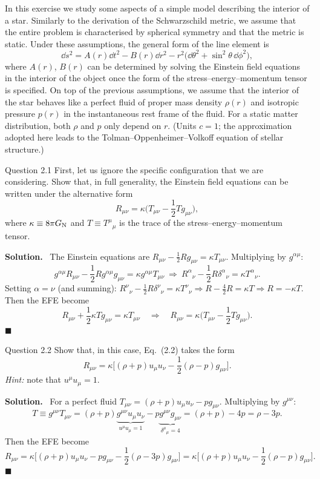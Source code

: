 \documentclass[11pt,a4paper]{article}
\numberwithin{equation}{subsection}
\newenvironment{solution}{\par\noindent\textbf{\textcolor{excol!70!black}{Solution.}}\ }{\hfill$\blacksquare$\par\medskip}
\begin{document}
In this exercise we study some aspects of a simple model describing the interior of a star. Similarly to the derivation of the Schwarzschild metric, we assume that the entire problem is characterised by spherical symmetry and that the metric is static. Under these assumptions, the general form of the line element is
\[
  \dd s^2=A(r)\dd t^2-B(r)\dd r^2-r^2\big(\dd\theta^2+\sin^2\theta\,\dd\phi^2\big), \tag{2.1}
\]
where $A(r)$, $B(r)$ can be determined by solving the Einstein field equations in the interior of the object once the form of the stress--energy--momentum tensor is specified. On top of the previous assumptions, we assume that the interior of the star behaves like a perfect fluid of proper mass density $\rho(r)$ and isotropic pressure $p(r)$ in the instantaneous rest frame of the fluid. For a static matter distribution, both $\rho$ and $p$ only depend on $r$. (Units $c=1$; the approximation adopted here leads to the Tolman--Oppenheimer--Volkoff equation of stellar structure.)

\begin{problem}{Question 2.1}
First, let us ignore the specific configuration that we are considering. Show that, in full generality, the Einstein field equations can be written under the alternative form
\[
  R_{\mu\nu}=\kappa\Big(T_{\mu\nu}-\frac12Tg_{\mu\nu}\Big), \tag{2.2}
\]
where $\kappa\equiv8\pi G_{\mathrm N}$ and $T\equiv T^\mu{}_\mu$ is the trace of the stress--energy--momentum tensor.
\end{problem}
\begin{solution}
The Einstein equations are $R_{\mu\nu}-\frac12Rg_{\mu\nu}=\kappa T_{\mu\nu}$. Multiplying by $g^{\alpha\mu}$:
\[
  g^{\alpha\mu}R_{\mu\nu}-\frac12Rg^{\alpha\mu}g_{\mu\nu}=\kappa g^{\alpha\mu}T_{\mu\nu}\ \Rightarrow\ R^\alpha{}_\nu-\frac12R\delta^\alpha{}_\nu=\kappa T^\alpha{}_\nu .
\]
Setting $\alpha=\nu$ (and summing): $R^\nu{}_\nu-\frac12R\delta^\nu{}_\nu=\kappa T^\nu{}_\nu\Rightarrow R-\frac42R=\kappa T\Rightarrow R=-\kappa T$. Then the EFE become
\[
  R_{\mu\nu}+\frac12\kappa Tg_{\mu\nu}=\kappa T_{\mu\nu}\quad\Longrightarrow\quad R_{\mu\nu}=\kappa\Big(T_{\mu\nu}-\frac12Tg_{\mu\nu}\Big).
\]
\end{solution}

\begin{problem}{Question 2.2}
Show that, in this case, Eq.~(2.2) takes the form
\[
  R_{\mu\nu}=\kappa\Big[(\rho+p)u_\mu u_\nu-\frac12(\rho-p)g_{\mu\nu}\Big]. \tag{2.3}
\]
\emph{Hint:} note that $u^\mu u_\mu=1$.
\end{problem}
\begin{solution}
For a perfect fluid $T_{\mu\nu}=(\rho+p)u_\mu u_\nu-pg_{\mu\nu}$. Multiplying by $g^{\mu\nu}$:
\[
  T\equiv g^{\mu\nu}T_{\mu\nu}=(\rho+p)\underbrace{g^{\mu\nu}u_\mu u_\nu}_{u^\mu u_\mu=1}-p\underbrace{g^{\mu\nu}g_{\mu\nu}}_{\delta^\mu{}_\mu=4}=(\rho+p)-4p=\rho-3p .
\]
Then the EFE become
\[
  R_{\mu\nu}=\kappa\Big[(\rho+p)u_\mu u_\nu-pg_{\mu\nu}-\frac12(\rho-3p)g_{\mu\nu}\Big]=\kappa\Big[(\rho+p)u_\mu u_\nu-\frac12(\rho-p)g_{\mu\nu}\Big].
\]
\end{solution}
\end{document}
